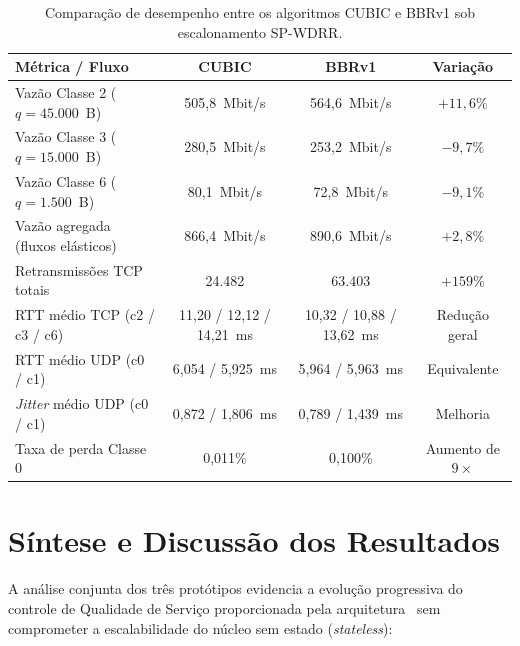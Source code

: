 \begin{table}[htbp]
\centering
\caption{Comparação de desempenho entre os algoritmos CUBIC e BBRv1 sob escalonamento SP-WDRR.}
\label{tab:comparacao_cubic_bbr}
\begin{tabularx}{\textwidth}{Xccc}
\toprule
\textbf{Métrica / Fluxo} & \textbf{CUBIC} & \textbf{BBRv1} & \textbf{Variação} \\
\midrule
Vazão Classe 2 ($q=45.000$~B)     & 505,8~Mbit/s & 564,6~Mbit/s & $+11,6\%$ \\
Vazão Classe 3 ($q=15.000$~B)     & 280,5~Mbit/s & 253,2~Mbit/s & $-9,7\%$  \\
Vazão Classe 6 ($q=1.500$~B)      & 80,1~Mbit/s  & 72,8~Mbit/s  & $-9,1\%$  \\
Vazão agregada (fluxos elásticos) & 866,4~Mbit/s & 890,6~Mbit/s & $+2,8\%$  \\
Retransmissões TCP totais         & 24.482       & 63.403       & $+159\%$  \\
RTT médio TCP (c2 / c3 / c6)      & 11,20 / 12,12 / 14,21~ms & 10,32 / 10,88 / 13,62~ms & Redução geral \\
RTT médio UDP (c0 / c1)           & 6,054 / 5,925~ms & 5,964 / 5,963~ms & Equivalente \\
\textit{Jitter} médio UDP (c0 / c1) & 0,872 / 1,806~ms & 0,789 / 1,439~ms & Melhoria \\
Taxa de perda Classe 0            & 0,011\%      & 0,100\%      & Aumento de $9\times$ \\
\bottomrule
\end{tabularx}
\end{table}

\section{Síntese e Discussão dos Resultados}
\label{sec:sintese_resultados}

A análise conjunta dos três protótipos evidencia a evolução progressiva do controle de Qualidade de Serviço proporcionada pela arquitetura \nome\ sem comprometer a escalabilidade do núcleo sem estado (\textit{stateless}):


